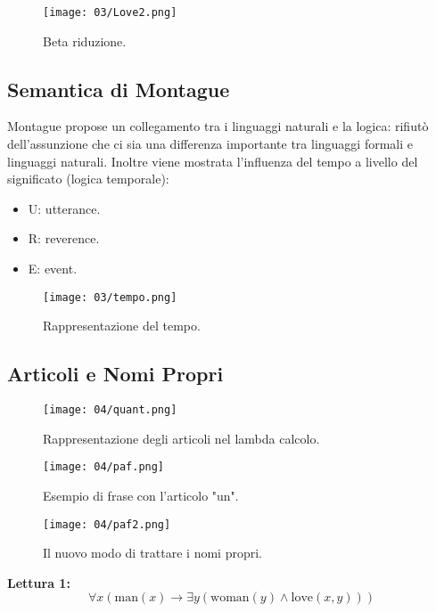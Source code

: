 \begin{figure}[!h]
    \centering
    \texttt{[image: 03/Love2.png]}
    \caption{Beta riduzione.}
\end{figure}

\subsection{Semantica di Montague}

Montague propose un collegamento tra i linguaggi naturali e la logica: rifiutò dell'assunzione che ci sia una differenza importante tra linguaggi formali e linguaggi naturali. Inoltre viene mostrata l'influenza del tempo a livello del significato (logica temporale):

\begin{itemize}
  \item U: utterance. 
  \item R: reverence. 
  \item E: event.
\end{itemize}


\begin{figure}[!h]
    \centering
    \texttt{[image: 03/tempo.png]}
    \caption{Rappresentazione del tempo.}
\end{figure}
\pagebreak
\subsection{Articoli e Nomi Propri}
\begin{figure}[!h]
    \centering
    \texttt{[image: 04/quant.png]}
    \caption{Rappresentazione degli articoli nel lambda calcolo.}
\end{figure}

\begin{figure}[!h]
    \centering
    \texttt{[image: 04/paf.png]}
    \caption{Esempio di frase con l'articolo "un".}
\end{figure}

\begin{figure}[!h]
    \centering
    \texttt{[image: 04/paf2.png]}
    \caption{Il nuovo modo di trattare i nomi propri.}
\end{figure}


\textbf{Lettura 1:}
\[
\forall x (\text{man}(x) \to \exists y (\text{woman}(y) \wedge \text{love}(x, y)))
\]

